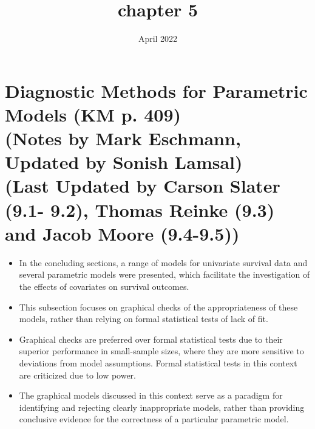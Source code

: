 \documentclass[10pt]{article}\usepackage[]{graphicx}\usepackage[]{xcolor}
\title{chapter 5}
\date{April 2022}
\theoremstyle{definition}
\numberwithin{equation}{subsection}
\numberwithin{figure}{section}
\numberwithin{table}{subsection}
\numberwithin{Report}{section}
\numberwithin{Example}{subsection}
\begin{document}
\tableofcontents

\newpage

\section{Diagnostic Methods for Parametric Models (KM p. 409) \\
\small{(Notes by Mark Eschmann, Updated by Sonish Lamsal)\\
(Last Updated by Carson Slater (9.1- 9.2), Thomas Reinke (9.3) and Jacob Moore (9.4-9.5))}} 
\normalsize




\begin{itemize}
\item In the concluding sections, a range of models for univariate survival data and several parametric models were presented, which facilitate the investigation of the effects of covariates on survival outcomes.
\item This subsection focuses on graphical checks of the appropriateness of these models, rather than relying on formal statistical tests of lack of fit.
\item Graphical checks are preferred over formal statistical tests due to their superior performance in small-sample sizes, where they are more sensitive to deviations from model assumptions. Formal statistical tests in this context are criticized due to low power.
\item The graphical models discussed in this context serve as a paradigm for identifying and rejecting clearly inappropriate models, rather than providing conclusive evidence for the correctness of a particular parametric model.
\end{itemize}
\end{document}
